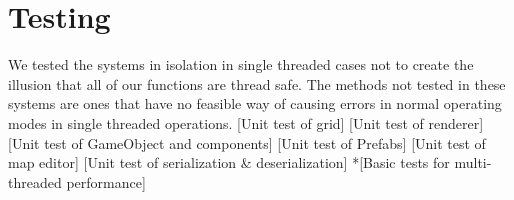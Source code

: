 \documentclass[main.tex]{subfiles}
\begin{document}
\section{Testing}
We tested the systems in isolation in single threaded cases  not to create the illusion that all of our functions are thread safe.
The methods not tested in these systems are ones that have no feasible way of causing errors in normal operating modes in single threaded operations.
[Unit test of grid]
[Unit test of renderer]
[Unit test of GameObject and components]
[Unit test of Prefabs]
[Unit test of map editor]
[Unit test of serialization \& deserialization]
*[Basic tests for multi-threaded performance]
\end{document}

